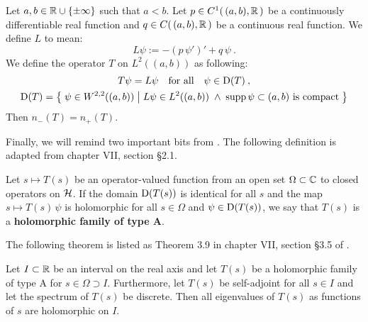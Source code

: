 \begin{thm}
    \label{thm-deficiency-diff-op}
    Let $a,b \in \mathbb{R} \cup \{ \pm\infty \}$ such that $a<b$. Let $p \in C^1( \, (a,b), \mathbb{R} \, )$ be a continuously differentiable real function and $q \in C( \, (a,b), \mathbb{R} \, )$ be a continuous real function. We define $L$ to mean:
    \begin{equation*}
        L \psi := -(p \, \psi')' + q \, \psi
        \: .
    \end{equation*}
    We define the operator $T$ on $L^2((a,b))$ as following:
    \begin{gather*}
        T \psi = L \psi
        \quad \text{for all} \quad
        \psi \in \mathrm{D}(T)
        \: ,
        \\
        \mathrm{D}(T) = \big\{\;
            \psi \in W^{2,2}((a,b))
            \;\big|\;
            L\psi \in L^2((a,b))
            \;\wedge\;
            \operatorname{supp} \psi \subset (a,b)
            \text{ is compact}
        \;\big\}
    \end{gather*}
    Then $n_-(T) = n_+(T)$.
\end{thm}

Finally, we will remind two important bits from \citet{Kato1995}. The following definition is adapted from chapter VII, section §2.1.
\begin{defn}
    \label{defn-holo-type-A}
    Let $s \mapsto T(s)$ be an operator-valued function from an open set $\Omega \subset \mathbb{C}$ to closed operators on $\mathcal{H}$. If the domain $\mathrm{D}(T(s))$ is identical for all $s$ and the map $s \mapsto T(s) \, \psi$ is holomorphic for all $s \in \Omega$ and $\psi \in \mathrm{D}(T(s))$, we say that $T(s)$ is a \textbf{holomorphic family of type A}.
\end{defn}
The following theorem is listed as Theorem 3.9 in chapter VII, section §3.5 of \citet{Kato1995}.
\begin{thm}
    \label{thm-eigenval-holo}
    Let $I\subset\mathbb{R}$ be an interval on the real axis and let $T(s)$ be a holomorphic family of type A for $s \in \Omega \supset I$. Furthermore, let $T(s)$ be self-adjoint for all $s \in I$ and let the spectrum of $T(s)$ be discrete. Then all eigenvalues of $T(s)$ as functions of $s$ are holomorphic on $I$.
\end{thm}



